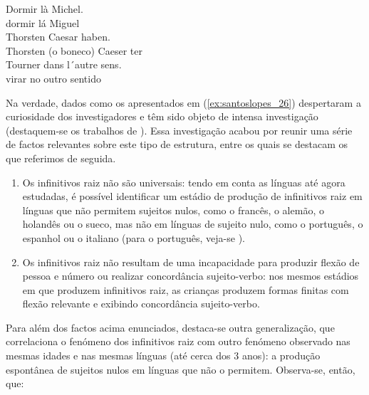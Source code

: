 \documentclass[output=paper]{LSP/langsci}
\begin{document}
\ea\label{ex:santoslopes_26}
\ea\label{ex:santoslopes_26a}
\gll Dormir là Michel.\\
dormir lá Miguel\\
\ex\label{ex:santoslopes_26b}
\gll Thorsten Caesar haben.\\
{Thorsten (o boneco)} Caeser ter\\
\ex\label{ex:santoslopes_26c}
\gll Tourner dans l´autre sens.\\
virar no outro sentido\\
\zl

Na verdade, dados como os apresentados em (\ref{ex:santoslopes_26}) despertaram a curiosidade dos investigadores e têm sido objeto de intensa investigação (destaquem-se os trabalhos de \citealt{wexler1994,wexler1998,rizzi1993,hoekstrahyams1998}). Essa investigação acabou por reunir uma série de factos relevantes sobre este tipo de estrutura, entre os quais se destacam os que referimos de seguida.

\begin{enumerate}[label=(\roman*)]
\item Os infinitivos raiz não são universais: tendo em conta as línguas até agora estudadas, é possível identificar um estádio de produção de infinitivos raiz em línguas que não permitem sujeitos nulos, como o francês, o alemão, o holandês ou o sueco, mas não em línguas de sujeito nulo, como o português, o espanhol ou o italiano (para o português, veja-se \citealt{lopes2003,goncalves2004,santosduarte2011}).
\item Os infinitivos raiz não resultam de uma incapacidade para produzir flexão de pessoa e número ou realizar concordância sujeito-verbo: nos mesmos estádios em que produzem infinitivos raiz, as crianças produzem formas finitas com flexão relevante e exibindo concordância sujeito-verbo.
\end{enumerate}
Para além dos factos acima enunciados, destaca-se outra generalização, que correlaciona o fenómeno dos infinitivos raiz com outro fenómeno observado nas mesmas idades e nas mesmas línguas (até cerca dos 3 anos): a produção espontânea de sujeitos nulos em línguas que não o permitem. Observa-se, então, que:
\end{document}

